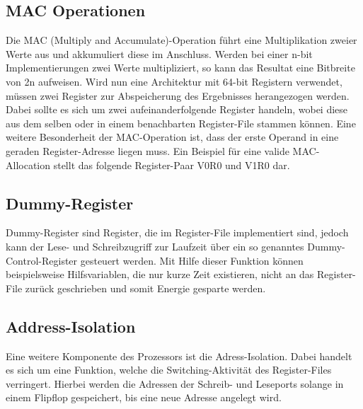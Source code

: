 \subsection{MAC Operationen}\label{subsec:macMode}
Die MAC (Multiply and Accumulate)-Operation führt eine Multiplikation zweier Werte aus und akkumuliert diese im Anschluss. Werden bei einer n-bit Implementierungen zwei Werte multipliziert, so kann das Resultat eine Bitbreite von 2n aufweisen. Wird nun eine Architektur mit 64-bit Registern verwendet, müssen zwei Register zur Abspeicherung des Ergebnisses herangezogen werden. Dabei sollte es sich um zwei aufeinanderfolgende Register handeln, wobei diese aus dem selben oder in einem benachbarten Register-File stammen können. Eine weitere Besonderheit der MAC-Operation ist, dass der erste Operand in eine geraden Register-Adresse liegen muss. Ein Beispiel für eine valide MAC-Allocation stellt das folgende Register-Paar V0R0 und V1R0 dar.
  

\subsection{Dummy-Register}\label{subsec:dummy}
Dummy-Register sind Register, die im Register-File implementiert sind, jedoch kann der Lese- und Schreibzugriff zur Laufzeit über ein so genanntes Dummy-Control-Register gesteuert werden. Mit Hilfe dieser Funktion können beispielsweise Hilfsvariablen, die nur kurze Zeit existieren, nicht an das Register-File zurück geschrieben und somit Energie gesparte werden.

\subsection{Address-Isolation}\label{subsec:add_iso}
Eine weitere Komponente des Prozessors ist die Adress-Isolation. Dabei handelt es sich um eine Funktion, welche die Switching-Aktivität des Register-Files verringert. Hierbei werden die Adressen der Schreib- und Leseports solange in einem Flipflop gespeichert, bis eine neue Adresse angelegt wird.\cite{lukasglitches2017}


